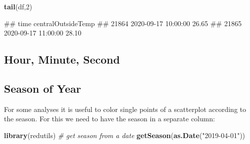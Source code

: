 \documentclass[
  a4paperpaper,
]{book}
\newenvironment{Shaded}{\begin{snugshade}}{\end{snugshade}}
\newcommand{\CommentTok}[1]{\textcolor[rgb]{0.56,0.35,0.01}{\textit{#1}}}
\newcommand{\DataTypeTok}[1]{\textcolor[rgb]{0.13,0.29,0.53}{#1}}
\newcommand{\DecValTok}[1]{\textcolor[rgb]{0.00,0.00,0.81}{#1}}
\newcommand{\KeywordTok}[1]{\textcolor[rgb]{0.13,0.29,0.53}{\textbf{#1}}}
\newcommand{\NormalTok}[1]{#1}
\newcommand{\OperatorTok}[1]{\textcolor[rgb]{0.81,0.36,0.00}{\textbf{#1}}}
\newcommand{\StringTok}[1]{\textcolor[rgb]{0.31,0.60,0.02}{#1}}
\let\oldShaded\Shaded
\let\endoldShaded\endShaded
\renewenvironment{Shaded}{\footnotesize\oldShaded}{\endoldShaded}
\let\oldverbatim\verbatim
\let\endoldverbatim\endverbatim
\renewenvironment{verbatim}{\footnotesize\oldverbatim}{\endoldverbatim}
\begin{document}
\begin{Shaded}
\begin{Highlighting}[]
\KeywordTok{tail}\NormalTok{(df,}\DecValTok{2}\NormalTok{)}
\end{Highlighting}
\end{Shaded}

\begin{verbatim}
##                      time centralOutsideTemp
## 21864 2020-09-17 10:00:00              26.65
## 21865 2020-09-17 11:00:00              28.10
\end{verbatim}

\hypertarget{hour-minute-second}{%
\subsection{Hour, Minute, Second}\label{hour-minute-second}}

\begin{Shaded}
\end{Shaded}

\newpage

\hypertarget{season-of-year}{%
\subsection{Season of Year}\label{season-of-year}}

For some analyses it is useful to color single points of a scatterplot according to the season. For this we need to have the season in a separate column:

\begin{Shaded}
\begin{Highlighting}[]
\KeywordTok{library}\NormalTok{(redutils)}
\CommentTok{# get season from a date}
\KeywordTok{getSeason}\NormalTok{(}\KeywordTok{as.Date}\NormalTok{(}\StringTok{"2019-04-01"}\NormalTok{))}
\end{Highlighting}
\end{Shaded}
\end{document}
